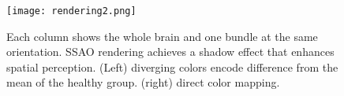 


\begin{figure}[tb]
\centering
\texttt{[image: rendering2.png]}
\caption{Each column shows the whole brain and one bundle at the same orientation. SSAO rendering achieves a shadow effect that enhances spatial perception. (Left) diverging colors encode difference from the mean of the healthy group. (right) direct color mapping.}
\label{fig:rendering}
\end{figure}

